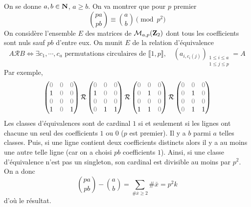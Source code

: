 On se donne $a, b\in\mathbf N$, $a\geq b$. On va montrer que pour $p$ premier \[
    \binom{pa}{pb}\equiv \binom ab\pmod {p^2}
\]
On considère l'ensemble $E$ des matrices de $\mathcal M_{a,p}(\mathbf Z_2)$ dont tous les coefficients sont nuls sauf $pb$ d'entre eux. On munit $E$ de la relation d'équivalence \[
    A\mathcal RB\iff \exists c_1, \cdots, c_a \text{ permutations circulaires de }\llbracket 1, p\rrbracket, \quad (a_{i, c_i(j)})_{\substack{1\leq i\leq a\\ 1\leq j\leq p}}=A
\]
Par exemple, \[
    \begin{pmatrix}
        {\color{gray}0}&{\color{gray}0}&{\color{gray}0}\\1&{\color{gray}0}&{\color{gray}0}\\{\color{gray}0}&{\color{gray}0}&{\color{gray}0}\\1&{\color{gray}0}&1
    \end{pmatrix}\mathcal R
    \begin{pmatrix}
        {\color{gray}0}&{\color{gray}0}&{\color{gray}0}\\1&{\color{gray}0}&{\color{gray}0}\\{\color{gray}0}&{\color{gray}0}&{\color{gray}0}\\{\color{gray}0}&1&1
    \end{pmatrix}\mathcal R
    \begin{pmatrix}
        {\color{gray}0}&{\color{gray}0}&{\color{gray}0}\\{\color{gray}0}&1&{\color{gray}0}\\{\color{gray}0}&{\color{gray}0}&{\color{gray}0}\\1&1&{\color{gray}0}
    \end{pmatrix}\mathcal R
    \begin{pmatrix}
        {\color{gray}0}&{\color{gray}0}&{\color{gray}0}\\{\color{gray}0}&1&{\color{gray}0}\\{\color{gray}0}&{\color{gray}0}&{\color{gray}0}\\{\color{gray}0}&1&1
    \end{pmatrix}
\]
Les classes d'équivalences sont de cardinal $1$ si et seulement si les lignes ont chacune un seul des coefficients $1$ ou $0$ ($p$ est premier). Il y a $b$ parmi $a$ telles classes. Puis, si une ligne contient deux coefficients distincts alors il y a au moins une autre telle ligne (car on a choisi $pb$ coefficients $1$). Ainsi, si une classe d'équivalence n'est pas un singleton, son cardinal est divisible au moins par $p^2$. On a donc \[
    \binom{pa}{pb}-\binom ab=\sum_{\#\bar x\geq 2}\#\bar x=p^2k
\]
d'où le résultat.

